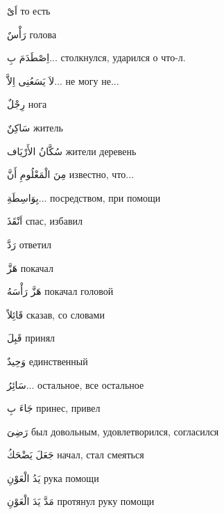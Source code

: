 \documentclass[a5paper]{article}
\newcommand\textstyleDropCaps[1]{#1}
\newcommand\textstyleCaptioncharacters[1]{#1}
\begin{document}
\textstyleCaptioncharacters{اَىْ }\textstyleDropCaps{то есть ‎}

\textstyleCaptioncharacters{رَأْسٌ }\textstyleDropCaps{голова‎}

\textstyleCaptioncharacters{اِصْطَدَمَ بِ... }\textstyleDropCaps{столкнул­ся, ударился о что-л.‎}

\textstyleCaptioncharacters{لاَ يَسَعُنِى اِلاَّ... }\textstyleDropCaps{не могу не...‎}

\textstyleCaptioncharacters{رِجْلٌ }\textstyleDropCaps{нога‎}

\textstyleCaptioncharacters{سَاكِنٌ }\textstyleDropCaps{житель‎}

\textstyleCaptioncharacters{سُكَّانُ الأَرْيَاف }\textstyleDropCaps{жители деревень‎}

\textstyleCaptioncharacters{مِنَ الْمَعْلُومِ أَنَّ }\textstyleDropCaps{из­вестно, что...‎}

\textstyleCaptioncharacters{بِوَاسِطَةِ... }\textstyleDropCaps{посредством, при помощи‎}

\textstyleCaptioncharacters{اَنْقَذَ }\textstyleDropCaps{спас, избавил‎}

\textstyleCaptioncharacters{رَدَّ }\textstyleDropCaps{ответил‎}

\textstyleCaptioncharacters{هَزَّ }\textstyleDropCaps{покачал‎}

\textstyleCaptioncharacters{هَزَّ رَأْسَهُ }\textstyleDropCaps{покачал голо­вой‎}

\textstyleCaptioncharacters{قَائِلاً }\textstyleDropCaps{сказав, со словами‎}

\textstyleCaptioncharacters{قَبِلَ }\textstyleDropCaps{принял‎}

\textstyleCaptioncharacters{وَحِيدٌ }\textstyleDropCaps{единственный‎}

\textstyleCaptioncharacters{سَائِرُ...ِ }\textstyleDropCaps{остальное, все остальное‎}

\textstyleCaptioncharacters{جَاءَ بِ }\textstyleDropCaps{принес, привел‎}

\textstyleCaptioncharacters{رَضِىَ }\textstyleDropCaps{был довольным, удовлетворился, согласился‎}

\textstyleCaptioncharacters{جَعَلَ يَضْحَكُ }\textstyleDropCaps{начал, стал смеяться‎}

\textstyleCaptioncharacters{يَدُ الْعَوْنِ }\textstyleDropCaps{рука помощи‎}

\textstyleCaptioncharacters{مَدَّ يَدَ الْعَوْنِ }\textstyleDropCaps{протянул руку помощи‎}
\end{document}
